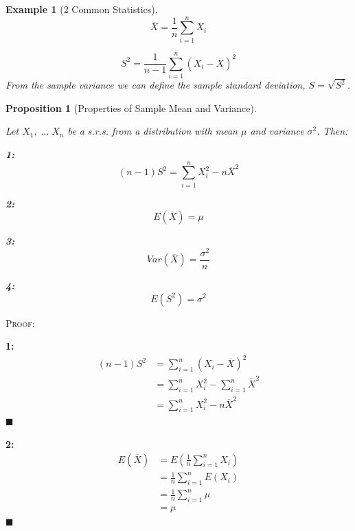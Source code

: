 \documentclass[12pt,a4paper]{article}
\newtheorem{ex}[thm]{Example}
\newtheorem{prop}[thm]{Proposition}
\begin{document}
\begin{ex}[2 Common Statistics]\vspace{1cm}

$$\overline{X} = \frac{1}{n} \sum_{i=1}^n X_i$$

$$S^2 = \frac{1}{n-1}\sum_{i=1}^n (X_i - \overline{X})^2$$
From the sample variance we can define the sample standard deviation, $S=\sqrt{S^2}$.

\end{ex}

\begin{prop}[Properties of Sample Mean and Variance]\label{sample moments}\vspace{1cm}

Let $X_1,\;\hdots\; X_n$ be a s.r.s. from a distribution with mean $\mu$ and variance $\sigma^2$. Then:

{\bf 1: }
$$(n-1)S^2 = \sum_{i=1}^n X_i^2 - n\overline{X}^2$$

{\bf 2:}
$$E(\overline{X}) = \mu$$

{\bf 3:}
$$Var(\overline{X}) = \frac{\sigma^2}{n}$$

{\bf 4:}
$$E(S^2) = \sigma^2$$

\end{prop}

\noindent\textsc{Proof:}\par\vspace{1cm}

{\bf 1: }
\begin{align*}
(n-1)S^2 &= \sum_{i=1}^n (X_i-\overline{X})^2\\
&= \sum_{i=1}^n X_i^2 - \sum_{i=1}^n \overline{X}^2\\
&= \sum_{i=1}^n X_i^2 - n\overline{X}^2
\end{align*}\hfill$\blacksquare$

{\bf 2:}
\begin{align*}
E(\overline{X}) &= E(\frac{1}{n}\sum_{i=1}^n X_i)\\
&= \frac{1}{n}\sum_{i=1}^n E(X_i)\\
&= \frac{1}{n} \sum_{i=1}^n \mu\\
&= \mu
\end{align*}\hfill$\blacksquare$
\end{document}
